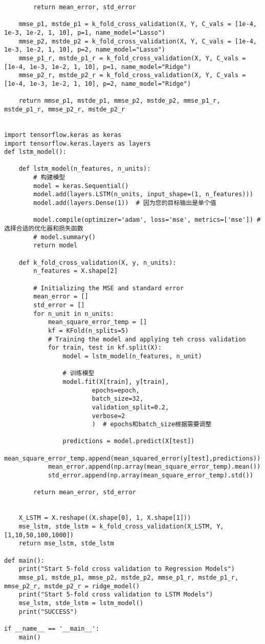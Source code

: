 \begin{lstlisting}
        return mean_error, std_error
    
    mmse_p1, mstde_p1 = k_fold_cross_validation(X, Y, C_vals = [1e-4, 1e-3, 1e-2, 1, 10], p=1, name_model="Lasso")
    mmse_p2, mstde_p2 = k_fold_cross_validation(X, Y, C_vals = [1e-4, 1e-3, 1e-2, 1, 10], p=2, name_model="Lasso")
    mmse_p1_r, mstde_p1_r = k_fold_cross_validation(X, Y, C_vals = [1e-4, 1e-3, 1e-2, 1, 10], p=1, name_model="Ridge")
    mmse_p2_r, mstde_p2_r = k_fold_cross_validation(X, Y, C_vals = [1e-4, 1e-3, 1e-2, 1, 10], p=2, name_model="Ridge")

    return mmse_p1, mstde_p1, mmse_p2, mstde_p2, mmse_p1_r, mstde_p1_r, mmse_p2_r, mstde_p2_r


import tensorflow.keras as keras
import tensorflow.keras.layers as layers
def lstm_model():
    
    def lstm_model(n_features, n_units):
        # 构建模型
        model = keras.Sequential()
        model.add(layers.LSTM(n_units, input_shape=(1, n_features)))
        model.add(layers.Dense(1))  # 因为您的目标输出是单个值

        model.compile(optimizer='adam', loss='mse', metrics=['mse']) # 选择合适的优化器和损失函数
        # model.summary()
        return model
            
    def k_fold_cross_validation(X, y, n_units):
        n_features = X.shape[2]
        
        # Initializing the MSE and standard error
        mean_error = []
        std_error = []
        for n_unit in n_units:
            mean_square_error_temp = []
            kf = KFold(n_splits=5)
            # Training the model and applying teh cross validation
            for train, test in kf.split(X):
                model = lstm_model(n_features, n_unit)
                
                # 训练模型
                model.fit(X[train], y[train], 
                        epochs=epoch, 
                        batch_size=32, 
                        validation_split=0.2,
                        verbose=2
                        )  # epochs和batch_size根据需要调整
                
                predictions = model.predict(X[test])
                mean_square_error_temp.append(mean_squared_error(y[test],predictions))
            mean_error.append(np.array(mean_square_error_temp).mean())
            std_error.append(np.array(mean_square_error_temp).std())

        return mean_error, std_error
    
    
    X_LSTM = X.reshape((X.shape[0], 1, X.shape[1]))
    mse_lstm, stde_lstm = k_fold_cross_validation(X_LSTM, Y, [1,10,50,100,1000])
    return mse_lstm, stde_lstm
    
def main():
    print("Start 5-fold cross validation to Regression Models")
    mmse_p1, mstde_p1, mmse_p2, mstde_p2, mmse_p1_r, mstde_p1_r, mmse_p2_r, mstde_p2_r = ridge_model()
    print("Start 5-fold cross validation to LSTM Models")
    mse_lstm, stde_lstm = lstm_model()
    print("SUCCESS")

if __name__ == '__main__':
    main()
\end{lstlisting}

